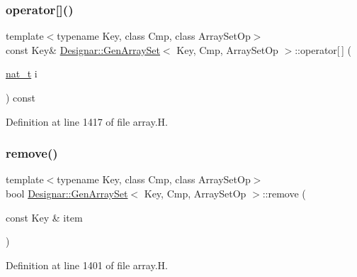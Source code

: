 \subsubsection{\texorpdfstring{operator[]()}{operator[]()}\hspace{0.1cm}{\footnotesize\ttfamily [2/2]}}
{\footnotesize\ttfamily template$<$typename Key, class Cmp, class Array\+Set\+Op$>$ \\
const Key\& \hyperlink{class_designar_1_1_gen_array_set}{Designar\+::\+Gen\+Array\+Set}$<$ Key, Cmp, Array\+Set\+Op $>$\+::operator\mbox{[}$\,$\mbox{]} (\begin{DoxyParamCaption}\item[{\hyperlink{namespace_designar_aa72662848b9f4815e7bf31a7cf3e33d1}{nat\+\_\+t}}]{i }\end{DoxyParamCaption}) const\hspace{0.3cm}{\ttfamily [inline]}}



Definition at line 1417 of file array.\+H.

\mbox{\label{class_designar_1_1_gen_array_set_acddff41221307179e0b4c20afbcfe253}} 
\subsubsection{\texorpdfstring{remove()}{remove()}}
{\footnotesize\ttfamily template$<$typename Key, class Cmp, class Array\+Set\+Op$>$ \\
bool \hyperlink{class_designar_1_1_gen_array_set}{Designar\+::\+Gen\+Array\+Set}$<$ Key, Cmp, Array\+Set\+Op $>$\+::remove (\begin{DoxyParamCaption}\item[{const Key \&}]{item }\end{DoxyParamCaption})\hspace{0.3cm}{\ttfamily [inline]}}



Definition at line 1401 of file array.\+H.

\mbox{\label{class_designar_1_1_gen_array_set_ab6e8baee6087d491045de115ed7fb48e}} 
